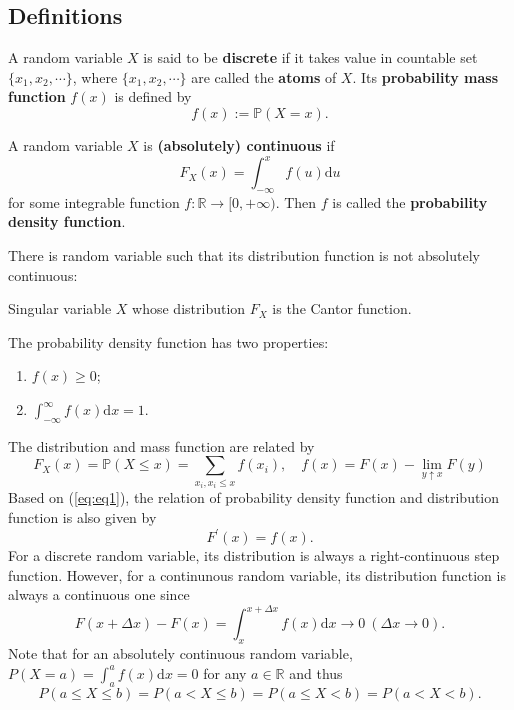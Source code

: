 \documentclass[11pt,singlecolumn, openany, citestyle=authoryear]{elegantbook}
\begin{document}
\begin{CJK}{UTF8}{gbsn}
\section{Definitions}
\begin{definition}
    A random variable $X$ is said to be \textbf{discrete} if it takes value in 
    countable set $\{x_1,x_2,\cdots\}$, where $\{x_1,x_2,\cdots\}$ are called the 
    \textbf{atoms} of $X$. Its \textbf{probability mass function} $f(x)$
    is defined by 
    \begin{equation}
        f(x) := \mathbb{P}(X=x).
    \end{equation}
\end{definition}
\begin{definition}
    A random variable $X$ is \textbf{(absolutely) continuous} if 
    \begin{equation}\label{eq:eq1}
        F_X(x) = \int_{-\infty}^x f(u)\mathrm{d}u
    \end{equation}
    for some integrable function $f:\mathbb{R}\to [0,+\infty)$. Then 
    $f$ is called the \textbf{probability density function}. 
\end{definition}
\begin{remark}
    There is random variable such that its distribution function is not 
    absolutely continuous:
    \begin{example}
        Singular variable $X$ whose distribution $F_X$ is the Cantor function.
    \end{example}    
\end{remark}
The probability density function has two properties:
\begin{enumerate}
    \item $f(x)\geqslant 0$;
    \item $\displaystyle \int_{-\infty}^\infty f(x)\mathrm{d}x=1$.
\end{enumerate}
The distribution and mass function are related by 
$$
    F_X(x) = \mathbb{P}(X\leqslant x) = \sum_{x_i,x_i\leqslant x}f(x_i),\quad 
    f(x) = F(x)-\lim_{y \uparrow x}F(y)
$$
Based on (\ref{eq:eq1}), the relation of probability density function and distribution function is also 
given by 
\begin{equation}
    F^\prime(x)=f(x).
\end{equation}
For a discrete random variable, its distribution is always a right-continuous step function.
However, for a continunous random variable, its distribution function is always a continuous one 
since 
$$
F(x+\Delta x)-F(x)=\int_x^{x+\Delta x}f(x)\mathrm{d}x \to 0 \ (\Delta x \to 0).
$$
Note that for an absolutely continuous random variable, $P(X=a)=
\displaystyle\int_a^a f(x)\mathrm{d}x=0$ for any $a\in\mathbb{R}$ and 
thus 
$$
P(a\leqslant X \leqslant b) = P(a<X\leqslant b) = P(a\leqslant X < b)=P(a<X<b).
$$



\end{CJK}
\end{document}
